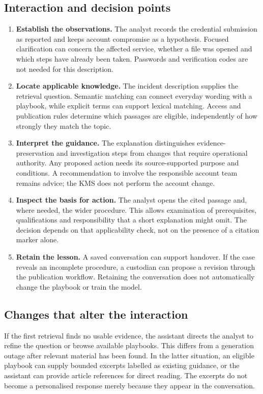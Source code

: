 \subsection{Interaction and decision points}
\begin{enumerate}
\item \textbf{Establish the observations.} The analyst records the credential submission as reported and keeps account compromise as a hypothesis. Focused clarification can concern the affected service, whether a file was opened and which steps have already been taken. Passwords and verification codes are not needed for this description.
\item \textbf{Locate applicable knowledge.} The incident description supplies the retrieval question. Semantic matching can connect everyday wording with a playbook, while explicit terms can support lexical matching. Access and publication rules determine which passages are eligible, independently of how strongly they match the topic.
\item \textbf{Interpret the guidance.} The explanation distinguishes evidence-preservation and investigation steps from changes that require operational authority. Any proposed action needs its source-supported purpose and conditions. A recommendation to involve the responsible account team remains advice; the KMS does not perform the account change.
\item \textbf{Inspect the basis for action.} The analyst opens the cited passage and, where needed, the wider procedure. This allows examination of prerequisites, qualifications and responsibility that a short explanation might omit. The decision depends on that applicability check, not on the presence of a citation marker alone.
\item \textbf{Retain the lesson.} A saved conversation can support handover. If the case reveals an incomplete procedure, a custodian can propose a revision through the publication workflow. Retaining the conversation does not automatically change the playbook or train the model.
\end{enumerate}

\subsection{Changes that alter the interaction}
If the first retrieval finds no usable evidence, the assistant directs the analyst to refine the question or browse available playbooks. This differs from a generation outage after relevant material has been found. In the latter situation, an eligible playbook can supply bounded excerpts labelled as existing guidance, or the assistant can provide article references for direct reading. The excerpts do not become a personalised response merely because they appear in the conversation.

